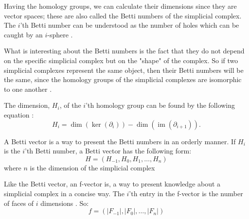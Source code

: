 \documentclass[11pt,a4paper,twoside, openright]{report}
\DeclareMathOperator{\im}{im}
\begin{document}
Having the homology groups, we can calculate their dimensions since they are vector spaces; these are also called the Betti numbers of the simplicial complex. The $i$'th Betti number can be understood as the number of holes which can be caught by an $i$-sphere \cite{wikiBetti}.

What is interesting about the Betti numbers is the fact that they do not depend on the  specific simplicial complex but on the "shape" of the complex. So if two simplicial complexes represent the same object, then their Betti numbers will be the same, since the homology groups of the simplicial complexes are isomorphic to one another \cite[p. 70]{Edelsbrunner}. 

The dimension, $H_i$, of the $i$'th homology group can be found by the following equation \cite[p.2]{Allgaier}:
\begin{equation}\label{eq:homology_group}
H_i = \dim(\ker(\partial_i))-\dim(\im(\partial_{i+1})).
\end{equation}

A Betti vector is a way to present the Betti numbers in an orderly manner. If $H_i$ is the $i$'th Betti number, a Betti vector has the following form:
\begin{equation*}
H = (H_{-1},H_0,H_1,\dots,H_n)
\end{equation*}
where $n$ is the dimension of the simplicial complex

Like the Betti vector, an f-vector is, a way to present knowledge about a simplicial complex in a concise way. The $i$'th entry in the f-vector is the number of faces of $i$ dimensions \cite[p.15]{Jonsson}. So:
\begin{equation*}
f = (|F_{-1}|,|F_0|,\dots,|F_n|)
\end{equation*}
\end{document}
